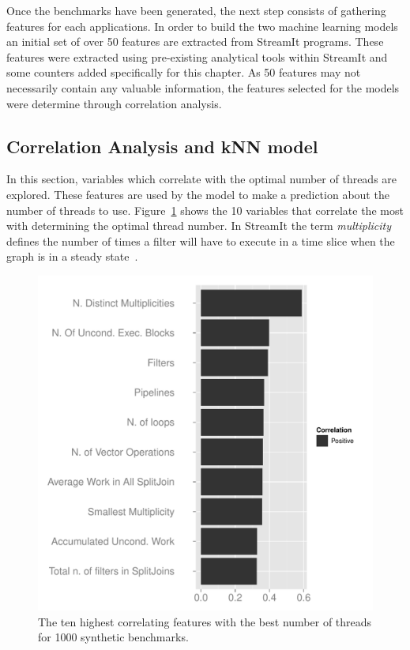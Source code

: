 Once the benchmarks have been generated, the next step consists of gathering features for each applications.
In order to build the two machine learning models an initial set of over 50 features are extracted from StreamIt programs.
These features were extracted using pre-existing analytical tools within StreamIt and some counters added specifically for this chapter.
As 50 features may not necessarily contain any valuable information, the features selected for the models were determine through correlation analysis.

\subsection{Correlation Analysis and kNN model}
In this section, variables which correlate with the optimal number of threads are explored.
These features are used by the model to make a prediction about the number of threads to use.
Figure~\ref{fig:corr} shows the 10 variables that correlate the most with determining the optimal thread number.
In StreamIt the term \textit{multiplicity} defines the number of times a filter will have to execute in a time slice when the graph is in a steady state~\cite{gordon2002streamcomp}.

\begin{figure}
  \includegraphics[width=1\textwidth]{streamit-paper/graphics/corrGraph.pdf}
  \caption{The ten highest correlating features with the best number of threads for 1000 synthetic benchmarks.}\label{fig:corr}
\end{figure}
 
